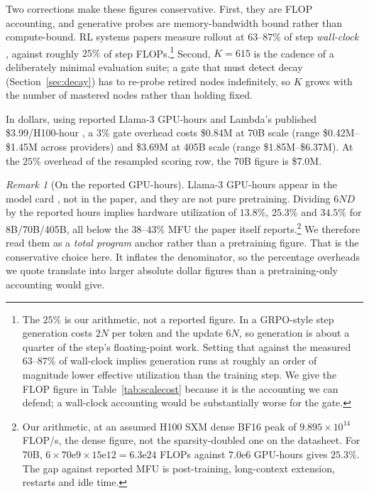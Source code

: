 \documentclass[11pt]{article}
\theoremstyle{plain}
\theoremstyle{definition}
\theoremstyle{remark}
\newtheorem{remark}{Remark}
\begin{document}
Two corrections make these figures conservative. First, they are FLOP
accounting, and generative probes are memory-bandwidth bound rather than
compute-bound. RL systems papers measure rollout at $63$--$87\%$ of step
\emph{wall-clock} \citep{seer2025}, against roughly $25\%$ of step
FLOPs.\footnote{The $25\%$ is our arithmetic, not a reported figure. In a
GRPO-style step generation costs $2N$ per token and the update $6N$, so
generation is about a quarter of the step's floating-point work. Setting that
against the measured $63$--$87\%$ of wall-clock implies generation runs at
roughly an order of magnitude lower effective utilization than the training step.
We give the FLOP figure in Table~\ref{tab:scalecost} because it is the accounting
we can defend; a wall-clock accounting would be substantially worse for the
gate.} Second, $K = 615$ is the cadence of a deliberately minimal evaluation
suite; a gate that must detect decay (Section~\ref{sec:decay}) has to re-probe
retired nodes indefinitely, so $K$ grows with the number of mastered nodes rather
than holding fixed.

In dollars, using reported Llama-3 GPU-hours \citep{meta2024llama31card} and
Lambda's published \$3.99/H100-hour \citep{lambda2026pricing}, a $3\%$ gate
overhead costs \$0.84M at 70B scale (range \$0.42M--\$1.45M across providers) and
\$3.69M at 405B scale (range \$1.85M--\$6.37M). At the $25\%$ overhead of the
resampled scoring row, the 70B figure is \$7.0M.

\begin{remark}[On the reported GPU-hours]
Llama-3 GPU-hours appear in the model card \citep{meta2024llama31card}, not in
the paper, and they are not pure pretraining. Dividing $6ND$ by the reported
hours implies hardware utilization of $13.8\%$, $25.3\%$ and $34.5\%$ for
8B/70B/405B, all below the $38$--$43\%$ MFU the paper itself
reports.\footnote{Our arithmetic, at an assumed H100 SXM dense BF16 peak of
$9.895 \times 10^{14}$ FLOP/s, the dense figure, not the sparsity-doubled one
on the datasheet. For 70B, $6 \times 70\mathrm{e}9 \times 15\mathrm{e}12 =
6.3\mathrm{e}24$ FLOPs against $7.0\mathrm{e}6$ GPU-hours gives $25.3\%$. The gap
against reported MFU is post-training, long-context extension, restarts and idle
time.} We therefore read them as a \emph{total program} anchor rather than a
pretraining figure. That is the conservative choice here. It inflates the
denominator, so the percentage overheads we quote translate into larger absolute
dollar figures than a pretraining-only accounting would give.
\end{remark}
\end{document}
